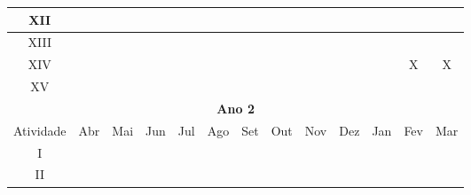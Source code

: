 \begin{quadro}[ht]
\begin{tabular}{|ccccccccccccc|}
\hline
\multicolumn{1}{|c|}{XII}       & \multicolumn{1}{c|}{}    & \multicolumn{1}{c|}{}    & \multicolumn{1}{c|}{}    & \multicolumn{1}{c|}{}    & \multicolumn{1}{c|}{}    & \multicolumn{1}{c|}{}    & \multicolumn{1}{c|}{}    & \multicolumn{1}{c|}{}    & \multicolumn{1}{c|}{}    & \multicolumn{1}{c|}{}    & \multicolumn{1}{c|}{}    &   \multicolumn{1}{c|}{}  \\ 
\hline
\multicolumn{1}{|c|}{XIII}      & \multicolumn{1}{c|}{}    & \multicolumn{1}{c|}{}    & \multicolumn{1}{c|}{}    & \multicolumn{1}{c|}{}    & \multicolumn{1}{c|}{}    & \multicolumn{1}{c|}{}    & \multicolumn{1}{c|}{}    & \multicolumn{1}{c|}{}    & \multicolumn{1}{c|}{}    & \multicolumn{1}{c|}{}    & \multicolumn{1}{c|}{}    &   \multicolumn{1}{c|}{}  \\
\hline
\multicolumn{1}{|c|}{XIV}        & \multicolumn{1}{c|}{}    & \multicolumn{1}{c|}{}    & \multicolumn{1}{c|}{}    & \multicolumn{1}{c|}{}    & \multicolumn{1}{c|}{}    & \multicolumn{1}{c|}{}    & \multicolumn{1}{c|}{}    & \multicolumn{1}{c|}{}    & \multicolumn{1}{c|}{}    & \multicolumn{1}{c|}{}    & \multicolumn{1}{c|}{X}    &  \multicolumn{1}{c|}{X}   \\ 
\hline
\multicolumn{1}{|c|}{XV}         & \multicolumn{1}{c|}{}    & \multicolumn{1}{c|}{}    & \multicolumn{1}{c|}{}    & \multicolumn{1}{c|}{}    & \multicolumn{1}{c|}{}    & \multicolumn{1}{c|}{}    & \multicolumn{1}{c|}{}    & \multicolumn{1}{c|}{}    & \multicolumn{1}{c|}{}    & \multicolumn{1}{c|}{}    & \multicolumn{1}{c|}{}    &   \multicolumn{1}{c|}{}  \\ 
\hline
\multicolumn{13}{|c|}{\textbf{Ano 2}}                         \\ \hline
\multicolumn{1}{|c|}{Atividade} & \multicolumn{1}{c|}{Abr} & \multicolumn{1}{c|}{Mai} & \multicolumn{1}{c|}{Jun} & \multicolumn{1}{c|}{Jul} & \multicolumn{1}{c|}{Ago} & \multicolumn{1}{c|}{Set} & \multicolumn{1}{c|}{Out} & \multicolumn{1}{c|}{Nov} & \multicolumn{1}{c|}{Dez} & \multicolumn{1}{c|}{Jan} & \multicolumn{1}{c|}{Fev} & \multicolumn{1}{c|}{Mar} \\ 
\hline
\multicolumn{1}{|c|}{I}         & \multicolumn{1}{c|}{}    & \multicolumn{1}{c|}{}    & \multicolumn{1}{c|}{}    & \multicolumn{1}{c|}{}    & \multicolumn{1}{c|}{}    & \multicolumn{1}{c|}{}    & \multicolumn{1}{c|}{}    & \multicolumn{1}{c|}{}    & \multicolumn{1}{c|}{}    & \multicolumn{1}{c|}{}    & \multicolumn{1}{c|}{}    &   \multicolumn{1}{c|}{}  \\ 
\hline
\multicolumn{1}{|c|}{II}        & \multicolumn{1}{c|}{}    & \multicolumn{1}{c|}{}    & \multicolumn{1}{c|}{}    & \multicolumn{1}{c|}{}    & \multicolumn{1}{c|}{}    & \multicolumn{1}{c|}{}    & \multicolumn{1}{c|}{}    & \multicolumn{1}{c|}{}    & \multicolumn{1}{c|}{}    & \multicolumn{1}{c|}{}    & \multicolumn{1}{c|}{}    &  \multicolumn{1}{c|}{}   \\ 

\end{tabular}
\end{quadro}
